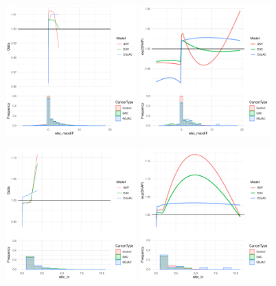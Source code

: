 \documentclass[12pt]{article}
\begin{document}
\begin{figure}[h]
\centering
\includegraphics[width=0.45\textwidth]{pdp/wbc_maxdiff.pdf}
\includegraphics[width=0.45\textwidth]{shap/wbc_maxdiff.pdf}
\end{figure}
\begin{figure}[h]
\centering
\includegraphics[width=0.45\textwidth]{pdp/wbc_tv.pdf}
\includegraphics[width=0.45\textwidth]{shap/wbc_tv.pdf}
\end{figure}
\end{document}
